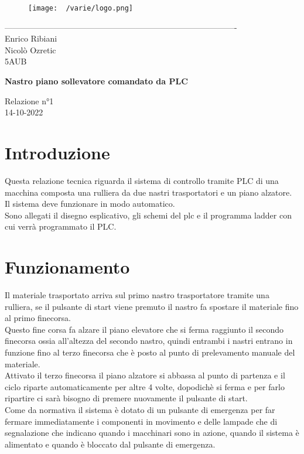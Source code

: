 \documentclass[12pt]{article}
\begin{document}
    \begin{titlepage}
    \begin{center}
\begin{figure}
    \centering
    \texttt{[image: ~/varie/logo.png]}
    \label{fig:logo}
\end{figure}
-------------------------------------------------------------------------------------\\
\vspace{2\baselineskip}
\large Enrico Ribiani\\
\large Nicolò Ozretic\\

\large 5AUB\\
\vfill

\Huge{\textbf{Nastro piano sollevatore comandato da PLC}}\\
\vfill

\LARGE{Relazione n°1}\\
\vfill
\large{14-10-2022}
\end{center}
\end{titlepage}
\tableofcontents
\vskip 1cm
\section{Introduzione}
Questa relazione tecnica riguarda il sistema di controllo tramite PLC di una macchina composta una rulliera
da due nastri trasportatori e un piano alzatore.\\
Il sistema deve funzionare in modo automatico.\\
Sono allegati il disegno esplicativo, gli schemi del plc e il programma ladder con cui verrà programmato
il PLC.\\


\section{Funzionamento}
Il materiale trasportato arriva sul primo nastro trasportatore tramite una rulliera, se il pulsante di start 
viene premuto il nastro fa spostare il materiale fino al primo finecorsa.\\
Questo fine corsa fa alzare il piano elevatore che si ferma raggiunto il secondo finecorsa ossia all'altezza 
del secondo nastro, quindi entrambi i nastri entrano in funzione fino al terzo finecorsa che è posto al punto 
di prelevamento manuale del materiale.\\
Attivato il terzo finecorsa il piano alzatore si abbassa al punto di partenza e il ciclo riparte automaticamente
per altre 4 volte, dopodichè si ferma e per farlo ripartire ci sarà bisogno di premere nuovamente il pulsante
di start.\\
Come da normativa il sistema è dotato di un pulsante di emergenza per far fermare immediatamente i componenti
in movimento e delle lampade che di segnalazione che indicano quando i macchinari sono in azione, quando il
sistema è alimentato e quando è bloccato dal pulsante di emergenza.\\
\end{document}
